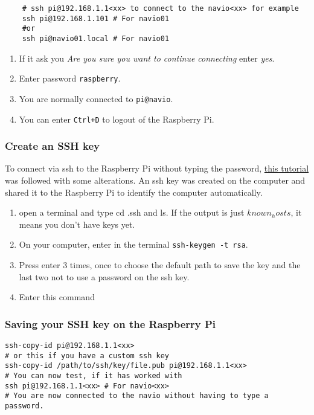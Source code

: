 \begin{verbatim}
    # ssh pi@192.168.1.1<xx> to connect to the navio<xx> for example
    ssh pi@192.168.1.101 # For navio01
    #or
    ssh pi@navio01.local # For navio01

                \end{verbatim}

\begin{enumerate}
    \item If it ask you \emph{Are you sure you want to continue connecting} enter \emph{yes}.
    \item Enter password \texttt{raspberry}.
    \item You are normally connected to \texttt{pi@navio}.
    \item You can enter \texttt{Ctrl+D} to logout of the Raspberry Pi.
\end{enumerate}

\subsubsection{Create an SSH key}
To connect via ssh to the Raspberry Pi without typing the password, \href{https://www.ssh.com/ssh/copy-id}{this tutorial} was followed with some alterations. An ssh key was created on the computer and shared it to the Raspberry Pi to identify the computer automatically.

\begin{enumerate}
    \item open a terminal and type cd .ssh and ls. If the output is just $known_hosts$, it means you don't have keys yet.
    \item On your computer, enter in the terminal \texttt{ssh-keygen -t rsa}.
    \item Press enter 3 times, once to choose the default path to save the key and the last two not to use a password on the ssh key.
    \item Enter this command
\end{enumerate}

\subsubsection{Saving your SSH key on the Raspberry Pi}

\begin{verbatim}
ssh-copy-id pi@192.168.1.1<xx>
# or this if you have a custom ssh key
ssh-copy-id /path/to/ssh/key/file.pub pi@192.168.1.1<xx>
# You can now test, if it has worked with
ssh pi@192.168.1.1<xx> # For navio<xx>
# You are now connected to the navio without having to type a password.
                \end{verbatim}

